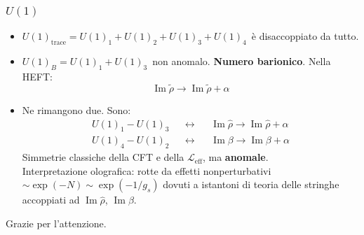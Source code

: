 \documentclass[aspectratio=43,mathserif]{beamer}
\newcommand{\hatt}[1]{\ensuremath{\widehat{#1}}}
\newcommand{\tildd}[1]{\ensuremath{\widetilde{#1}}}
\renewcommand{\Im}{\ensuremath{\operatorname{Im}}}
\newcommand{\leff}{\ensuremath{\mathcal{L}_\text{eff}}}
\begin{document}
\begin{frame}
	\frametitle{$U(1)$}

	\begin{itemize}
		\vfill\item \small$U(1)_\text{trace} = U(1)_1 + U(1)_2 + U(1)_3 + U(1)_4$\normalsize \, è disaccoppiato da tutto.
		\vfill\item \small$U(1)_B = U(1)_1 + U(1)_3$\normalsize \, non anomalo. \textbf{Numero barionico}. Nella HEFT:
			\begin{equation}
				\Im \tildd \rho \rightarrow \Im \tildd \rho + \alpha
				\label{}
			\end{equation}

		\vfill\vspace{-2pt}\item Ne rimangono due. Sono: \vspace{-4pt}
			\begin{align}
				U(1)_1 - U(1)_3 &&\leftrightarrow && \Im \hatt \rho \rightarrow \Im \hatt \rho + \alpha\\
				U(1)_4 - U(1)_2 &&\leftrightarrow &&\Im\beta \rightarrow \Im\beta + \alpha
			\end{align}
			Simmetrie classiche della CFT e della $\leff$, ma \textbf{anomale}.\\ Interpretazione olografica: rotte da effetti nonperturbativi $\sim \exp(-N) \sim \exp(-1/g_s)$ dovuti a istantoni di teoria delle stringhe accoppiati ad $\Im\hatt\rho$, $\Im\beta$.

	\end{itemize}
\end{frame}

\begin{frame}
	\begin{center}
		Grazie per l'attenzione.
	\end{center}
\end{frame}
\end{document}
